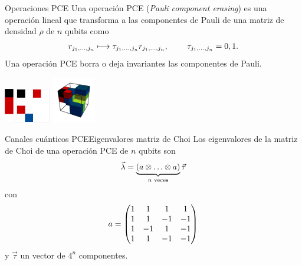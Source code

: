 \documentclass[xcolor=dvipsnames,presentation]{beamer}%
\begin{document}
\begin{frame}{Operaciones PCE}
	Una operación PCE (\textit{Pauli component erasing}) 
	es una operación lineal que transforma a las 	componentes 
	de Pauli de una matriz de densidad $\rho$ de $n$ qubits como
	\begin{align*}
	r_{j_1,\ldots,j_n}\longmapsto \tau_{j_1,\ldots,j_n}r_{j_1,\ldots,j_n},
	\hspace{.8cm}\tau_{j_1,\ldots,j_n}=0,1.
	\end{align*}
	Una operación PCE borra o deja invariantes las componentes de Pauli. 
	
	\hfill
	\includegraphics[height=1.5cm]{images/1qubit-pce-example001}
	\hspace{1.8cm}
	\includegraphics[height=1.5cm]{images/2qubit-pce-example001}
	\hfill
	\includegraphics[height=2cm]{images/3qubit-pce-example001}
	\hspace{1cm} 

	\vfill	
	
\end{frame}


\begin{frame}{Canales cuánticos PCE}{Eigenvalores matriz de Choi} 
Los eigenvalores de la matriz de Choi de una operación PCE 
de $n$ qubits son
\begin{align*}
\vec{\lambda} = 
\underbrace{\qty(a\otimes \ldots\otimes a)}_{n\text{ veces}} \vec{\tau}
\end{align*}
con
\begin{align*}
a=\mqty(1&1&1&1\\1&1&-1&-1\\1&-1&1&-1\\1&1&-1&-1)
\end{align*}
y $\vec{\tau}$ un vector de $4^n$ componentes.
\end{frame}
\end{document}
